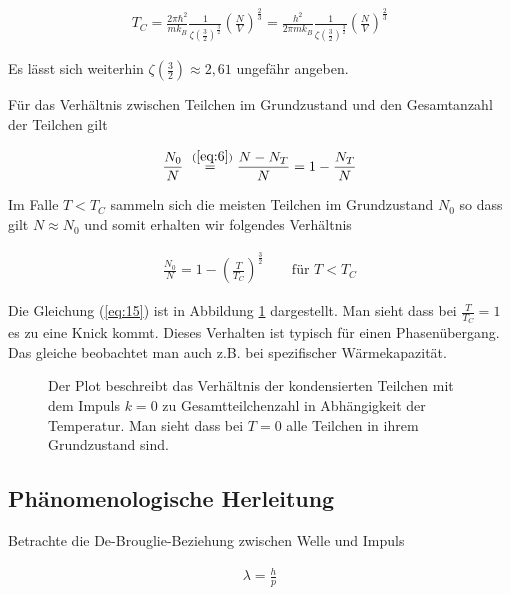 \begin{align}
  \label{eq:13}
  \boxed{ T_C = \frac{ 2\pi \hbar^2}{m k_B }\frac{1}{\zeta(\frac{3}{2})^{\frac{3}{2}}} \left( \frac{N}{V} \right)^{\frac{2}{3}} 
= \frac{ h^2}{2\pi m k_B }\frac{1}{\zeta(\frac{3}{2})^{\frac{3}{2}}} \left( \frac{N}{V} \right)^{\frac{2}{3}} }
\end{align}

Es lässt sich weiterhin  \( \zeta(\frac{3}{2}) \approx 2,61\) ungefähr angeben.


Für das Verhältnis zwischen Teilchen im Grundzustand und den Gesamtanzahl der Teilchen gilt

\begin{align}
  \label{eq:14}
  \frac{N_0}{N} \stackrel{~(\ref{eq:6})}= \frac{N-N_T} N = 1-\frac {N_T} N 
\end{align}

Im Falle \(T<T_C\) sammeln sich die meisten Teilchen im Grundzustand \(N_0\) so dass gilt \(N\approx N_0\) und somit erhalten wir folgendes Verhältnis

\begin{align}
  \label{eq:15}
 \frac{N_0}{N} = 1 - \left( \frac{T}{T_C}\right)^{\frac{3}{2}} \qquad \text{für } T<T_C
\end{align}

Die Gleichung (\ref{eq:15}) ist in Abbildung \ref{fig:1} dargestellt. Man sieht dass bei \(\frac{T}{T_C}=1\) es zu eine Knick kommt. Dieses Verhalten ist typisch für einen Phasenübergang. Das gleiche beobachtet man auch z.B. bei spezifischer Wärmekapazität. 

\begin{figure}
  \centering
  
  \caption{Der Plot beschreibt das Verhältnis  der kondensierten Teilchen mit dem Impuls \(k=0\) zu Gesamtteilchenzahl in Abhängigkeit der Temperatur. Man sieht dass bei \(T=0\) alle Teilchen in ihrem Grundzustand sind.}
  \label{fig:1}
\end{figure}






\subsection*{Phänomenologische Herleitung}

Betrachte die De-Brouglie-Beziehung zwischen Welle und Impuls

\begin{align}
  \label{eq:16}
  \lambda = \frac{h}{p}
\end{align}

